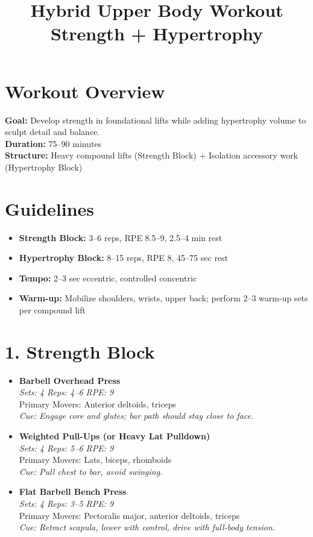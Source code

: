 \documentclass[12pt]{article}
\title{Hybrid Upper Body Workout \\ \large Strength + Hypertrophy}
\author{}
\date{}
\begin{document}
\maketitle

\section*{Workout Overview}
\textbf{Goal:} Develop strength in foundational lifts while adding hypertrophy volume to sculpt detail and balance. \\
\textbf{Duration:} 75--90 minutes \\
\textbf{Structure:} Heavy compound lifts (Strength Block) + Isolation accessory work (Hypertrophy Block)

\vspace{1em}
\section*{Guidelines}
\begin{itemize}[leftmargin=1.5em]
  \item \textbf{Strength Block:} 3--6 reps, RPE 8.5--9, 2.5--4 min rest
  \item \textbf{Hypertrophy Block:} 8--15 reps, RPE 8, 45--75 sec rest
  \item \textbf{Tempo:} 2--3 sec eccentric, controlled concentric
  \item \textbf{Warm-up:} Mobilize shoulders, wrists, upper back; perform 2–3 warm-up sets per compound lift
\end{itemize}

\vspace{1em}
\section*{1. Strength Block}

\begin{itemize}[leftmargin=1.5em]
  \item \textbf{Barbell Overhead Press} \\
    \textit{Sets: 4 \quad Reps: 4--6 \quad RPE: 9} \\
    Primary Movers: Anterior deltoids, triceps \\
    \textit{Cue: Engage core and glutes; bar path should stay close to face.}
    
  \item \textbf{Weighted Pull-Ups (or Heavy Lat Pulldown)} \\
    \textit{Sets: 4 \quad Reps: 5--6 \quad RPE: 9} \\
    Primary Movers: Lats, biceps, rhomboids \\
    \textit{Cue: Pull chest to bar, avoid swinging.}

  \item \textbf{Flat Barbell Bench Press} \\
    \textit{Sets: 4 \quad Reps: 3--5 \quad RPE: 9} \\
    Primary Movers: Pectoralis major, anterior deltoids, triceps \\
    \textit{Cue: Retract scapula, lower with control, drive with full-body tension.}
\end{itemize}
\end{document}
